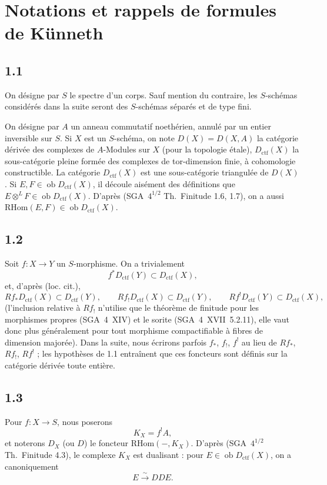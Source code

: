 \documentclass[11pt]{article}
\newcommand{\ob}{\operatorname{ob}}
\providecommand{\RHom}{\mathrm{RHom}}
\providecommand{\ctf}{\mathrm{ctf}}
\providecommand{\RHom}{\mathrm{RHom}}
\providecommand{\ob}{\operatorname{ob}}
\begin{document}
\section{Notations et rappels de formules de Künneth}

\subsection*{1.1}
On désigne par $S$ le spectre d'un corps. Sauf mention du contraire, les $S$-schémas considérés dans la suite seront des $S$-schémas séparés et de type fini.

On désigne par $A$ un anneau commutatif noethérien, annulé par un entier inversible sur $S$. Si $X$ est un $S$-schéma, on note $D(X)=D(X,A)$ la catégorie dérivée des complexes de $A$-Modules sur $X$ (pour la topologie étale), $D_{\ctf}(X)$ la sous-catégorie pleine formée des complexes de tor-dimension finie, à cohomologie constructible. La catégorie $D_{\ctf}(X)$ est une sous-catégorie triangulée de $D(X)$. Si $E,F \in \ob D_{\ctf}(X)$, il découle aisément des définitions que $E \otimes^{L} F \in \ob D_{\ctf}(X)$. D'après (SGA~$4^{1/2}$ Th.~Finitude 1.6, 1.7), on a aussi $\RHom(E,F) \in \ob D_{\ctf}(X)$.

\subsection*{1.2}
Soit $f:X\to Y$ un $S$-morphisme. On a trivialement
\[
f^{*}D_{\ctf}(Y) \subset D_{\ctf}(X),
\]
et, d'après (loc. cit.),
\[
Rf_{*}D_{\ctf}(X) \subset D_{\ctf}(Y),\qquad
Rf_{!}D_{\ctf}(X) \subset D_{\ctf}(Y),\qquad
Rf^{!}D_{\ctf}(Y) \subset D_{\ctf}(X),
\]
(l'inclusion relative à $Rf_{!}$ n'utilise que le théorème de finitude pour les morphismes propres (SGA~4~XIV) et le sorite (SGA~4~XVII~5.2.11), elle vaut donc plus généralement pour tout morphisme compactifiable à fibres de dimension majorée). Dans la suite, nous écrirons parfois $f_{*}$, $f_{!}$, $f^{!}$ au lieu de $Rf_{*}$, $Rf_{!}$, $Rf^{!}$ ; les hypothèses de 1.1 entraînent que ces foncteurs sont définis sur la catégorie dérivée toute entière.

\subsection*{1.3}
Pour $f:X\to S$, nous poserons
\[
K_X=f^{!}A,
\]
et noterons $D_X$ (ou $D$) le foncteur $\RHom(-,K_X)$. D'après (SGA~$4^{1/2}$ Th.~Finitude 4.3), le complexe $K_X$ est dualisant : pour $E\in\ob D_{\ctf}(X)$, on a canoniquement
\[
E \xrightarrow{\sim} DDE.
\]
\end{document}
